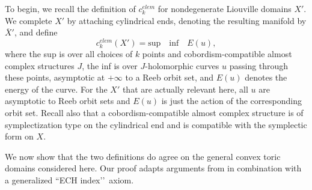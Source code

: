 \documentclass[11pt, reqno]{amsart}
\theoremstyle{remark}
\numberwithin{equation}{subsection}
\numberwithin{figure}{section}
\theoremstyle{customremark}
\newcommand{\Om}{{\Omega}}
\newcommand{\C}{\mathbb{C}}
\begin{document}
To begin, we recall the definition of  $c^{elem}_k$ for nondegenerate
 Liouville domains $X'$.  We complete $X'$ by attaching cylindrical ends, denoting the resulting manifold by $\overline{X}'$, and define 
\begin{equation}
\label{eqn:defnelemECH}
c^{elem}_k(X') = \text{sup} \quad \text{inf} \quad E(u),
\end{equation}
where the sup is over all choices of $k$ points and cobordism-compatible almost complex structures $J$, the inf is over $J$-holomorphic curves $u$ passing through these points, asymptotic at $+\infty$ to a Reeb orbit set, and $E(u)$ denotes the energy of the curve.  For the $X'$ that are actually relevant here, all $u$ are asymptotic to Reeb orbit sets and $E(u)$ is just the action of the corresponding orbit set.  
Recall also that a cobordism-compatible almost complex structure is  of symplectization type on the cylindrical end and is compatible with the symplectic form on $X$.  


We now show  that
the two definitions do agree on
 the general convex toric domains considered here. Our proof
adapts arguments from \cite[Sec. 5]{Helem} in combination with a generalized ``ECH index\rq\rq\,  axiom.
\end{document}
